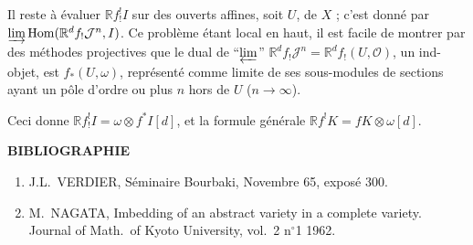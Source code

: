 \documentclass[12pt]{amsart}
\theoremstyle{plain}
\theoremstyle{definition}
\DeclareMathOperator{\Hom}{Hom}
\newcommand{\cJ}{\mathcal{J}}
\newcommand{\cO}{\mathcal{O}}
\newcommand{\bR}{\mathbb{R}}
\begin{document}
Il reste \`a \'evaluer $\bR f^{!}_{!}I$ sur des ouverts affines, soit $U$, de $X$ ; c'est donn\'e par $\varinjlim \Hom(\bR^{d}f_{!}\cJ^{n}, I)$. Ce probl\`eme \'etant local en haut, il est facile de montrer par des m\'ethodes projectives que le dual de ``$\varprojlim$'' $\bR^{d}f_{!}\cJ^{n} = \bR^{d}f_{!}(U,\cO)$, un ind-objet, est $f_{*}(U,\omega)$, repr\'esent\'e comme limite de ses sous-modules de sections ayant un p\^ole d'ordre ou plus $n$ hors de $U$ ($n \to \infty$).

Ceci donne $\bR f^{!}_{!}I = \omega \otimes f^{*}I[d]$, et la formule g\'en\'erale $\bR f^{!}K = fK \otimes \omega[d]$.

\bigskip

\begin{center}
\textbf{BIBLIOGRAPHIE}
\end{center}

\begin{enumerate}
\item[{[1]}] J.L.\ VERDIER, S\'eminaire Bourbaki, Novembre 65, expos\'e 300.
\item[{[2]}] M.\ NAGATA, Imbedding of an abstract variety in a complete variety. Journal of Math.\ of Kyoto University, vol.\ 2 n$^{\circ}$1 1962.
\end{enumerate}
\end{document}
